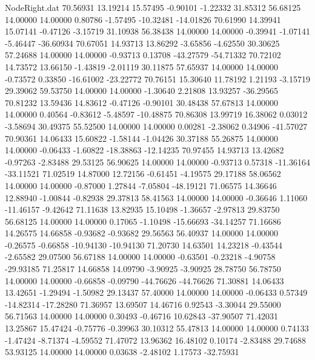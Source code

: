 \begin{filecontents}{NodeRight.dat}
  70.56931   13.19214   15.57495    -0.90101   -1.22332   31.85312   56.68125   14.00000   14.00000    0.80786   -1.57495  -10.32481  -14.01826
  70.61990   14.39941   15.07141    -0.47126   -3.15719   31.10938   56.38438   14.00000   14.00000   -0.39941   -1.07141   -5.46447  -36.60934
  70.67051   14.93713   13.86292    -3.65856   -4.62550   30.30625   57.24688   14.00000   14.00000   -0.93713    0.13708  -43.27579  -54.71332
  70.72102   14.73572   13.66150    -1.43819   -2.01119   30.11875   57.65937   14.00000   14.00000   -0.73572    0.33850  -16.61002  -23.22772
  70.76151   15.30640   11.78192     1.21193   -3.15719   29.39062   59.53750   14.00000   14.00000   -1.30640    2.21808   13.93257  -36.29565
  70.81232   13.59436   14.83612    -0.47126   -0.90101   30.48438   57.67813   14.00000   14.00000    0.40564   -0.83612   -5.48597  -10.48875
  70.86308   13.99719   16.38062     0.03012   -3.58694   30.49375   55.52500   14.00000   14.00000    0.00281   -2.38062    0.34906  -41.57027
  70.90361   14.06433   15.60822    -1.58144   -1.04426   30.37188   55.26875   14.00000   14.00000   -0.06433   -1.60822  -18.38863  -12.14235
  70.97455   14.93713   13.42682    -0.97263   -2.83488   29.53125   56.90625   14.00000   14.00000   -0.93713    0.57318  -11.36164  -33.11521
  71.02519   14.87000   12.72156    -0.61451   -4.19575   29.17188   58.06562   14.00000   14.00000   -0.87000    1.27844   -7.05804  -48.19121
  71.06575   14.36646   12.88940    -1.00844   -0.82938   29.37813   58.41563   14.00000   14.00000   -0.36646    1.11060  -11.46157   -9.42642
  71.11638   13.82935   15.10498    -1.36657   -2.97813   29.83750   56.68125   14.00000   14.00000    0.17065   -1.10498  -15.66693  -34.14257
  71.16686   14.26575   14.66858    -0.93682   -0.93682   29.56563   56.40937   14.00000   14.00000   -0.26575   -0.66858  -10.94130  -10.94130
  71.20730   14.63501   14.23218    -0.43544   -2.65582   29.07500   56.67188   14.00000   14.00000   -0.63501   -0.23218   -4.90758  -29.93185
  71.25817   14.66858   14.09790    -3.90925   -3.90925   28.78750   56.78750   14.00000   14.00000   -0.66858   -0.09790  -44.76626  -44.76626
  71.30881   14.06433   13.42651    -1.29494   -1.50982   29.13437   57.40000   14.00000   14.00000   -0.06433    0.57349  -14.82314  -17.28280
  71.36957   13.69507   14.46716     0.92543   -3.30044   29.55000   56.71563   14.00000   14.00000    0.30493   -0.46716   10.62843  -37.90507
  71.42031   13.25867   15.47424    -0.75776   -0.39963   30.10312   55.47813   14.00000   14.00000    0.74133   -1.47424   -8.71374   -4.59552
  71.47072   13.96362   16.48102     0.10174   -2.83488   29.74688   53.93125   14.00000   14.00000    0.03638   -2.48102    1.17573  -32.75931

\end{filecontents}
